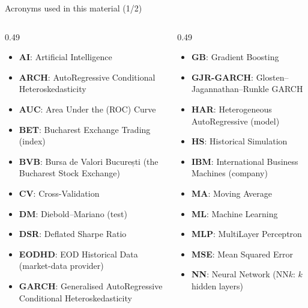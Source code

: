 
{
\begin{frame}[noframenumbering]
    \titlepage
\end{frame}
}
\begin{frame}{Acronyms used in this material (1/2)}
\begin{columns}[T]
\begin{column}{0.49\textwidth}
\begin{itemize}\setlength{\itemsep}{0pt}
    \item \textbf{AI}: Artificial Intelligence
    \item \textbf{ARCH}: AutoRegressive Conditional Heteroskedasticity
    \item \textbf{AUC}: Area Under the (ROC) Curve
    \item \textbf{BET}: Bucharest Exchange Trading (index)
    \item \textbf{BVB}: Bursa de Valori București (the Bucharest Stock Exchange)
    \item \textbf{CV}: Cross-Validation
    \item \textbf{DM}: Diebold–Mariano (test)
    \item \textbf{DSR}: Deflated Sharpe Ratio
    \item \textbf{EODHD}: EOD Historical Data (market-data provider)
    \item \textbf{GARCH}: Generalised AutoRegressive Conditional Heteroskedasticity
\end{itemize}
\end{column}
\begin{column}{0.49\textwidth}
\begin{itemize}\setlength{\itemsep}{0pt}
    \item \textbf{GB}: Gradient Boosting
    \item \textbf{GJR-GARCH}: Glosten–Jagannathan–Runkle GARCH
    \item \textbf{HAR}: Heterogeneous AutoRegressive (model)
    \item \textbf{HS}: Historical Simulation
    \item \textbf{IBM}: International Business Machines (company)
    \item \textbf{MA}: Moving Average
    \item \textbf{ML}: Machine Learning
    \item \textbf{MLP}: MultiLayer Perceptron
    \item \textbf{MSE}: Mean Squared Error
    \item \textbf{NN}: Neural Network (NN$k$: $k$ hidden layers)
\end{itemize}
\end{column}
\end{columns}
\end{frame}
